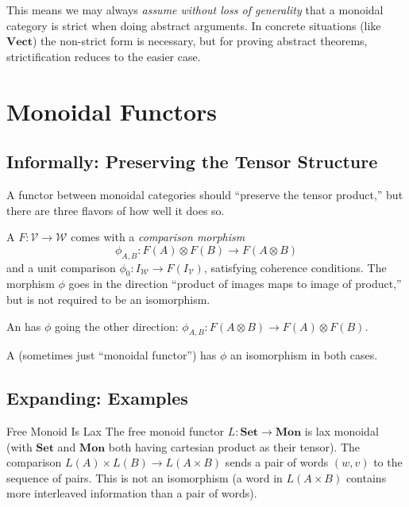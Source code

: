 This means we may always \emph{assume without loss of generality} that a
monoidal category is strict when doing abstract arguments. In concrete situations
(like $\mathbf{Vect}$) the non-strict form is necessary, but for proving
abstract theorems, strictification reduces to the easier case.


\section{Monoidal Functors}
\label{sec:monoidal-functors}

\subsection{Informally: Preserving the Tensor Structure}

A functor between monoidal categories should ``preserve the tensor product,''
but there are three flavors of how well it does so.

A  $F : \mathcal{V} \to \mathcal{W}$ comes with a
\emph{comparison morphism}
\begin{equation*}
  \phi_{A,B} : F(A) \otimes F(B) \to F(A \otimes B)
\end{equation*}
and a unit comparison $\phi_0 : I_\mathcal{W} \to F(I_\mathcal{V})$, satisfying
coherence conditions. The morphism $\phi$ goes in the direction ``product of
images maps to image of product,'' but is not required to be an isomorphism.

An  has $\phi$ going the other direction:
$\phi_{A,B} : F(A \otimes B) \to F(A) \otimes F(B)$.

A  (sometimes just ``monoidal functor'') has $\phi$
an isomorphism in both cases.

\subsection{Expanding: Examples}

\begin{example}{Free Monoid Is Lax}
The free monoid functor $L : \mathbf{Set} \to \mathbf{Mon}$ is lax monoidal
(with $\mathbf{Set}$ and $\mathbf{Mon}$ both having cartesian product as their
tensor). The comparison $L(A) \times L(B) \to L(A \times B)$ sends a pair of
words $(w, v)$ to the sequence of pairs. This is not an isomorphism (a word in
$L(A \times B)$ contains more interleaved information than a pair of words).
\end{example}

